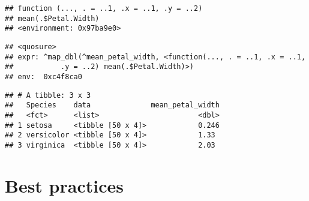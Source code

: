\documentclass[]{book}
\newenvironment{Shaded}{\begin{snugshade}}{\end{snugshade}}
\newcommand{\DataTypeTok}[1]{\textcolor[rgb]{0.13,0.29,0.53}{#1}}
\newcommand{\KeywordTok}[1]{\textcolor[rgb]{0.13,0.29,0.53}{\textbf{#1}}}
\newcommand{\NormalTok}[1]{#1}
\newcommand{\OperatorTok}[1]{\textcolor[rgb]{0.81,0.36,0.00}{\textbf{#1}}}
\newcommand{\StringTok}[1]{\textcolor[rgb]{0.31,0.60,0.02}{#1}}
\begin{document}
\begin{Shaded}
\end{Shaded}

\begin{verbatim}
## function (..., . = ..1, .x = ..1, .y = ..2) 
## mean(.$Petal.Width)
## <environment: 0x97ba9e0>
\end{verbatim}

\begin{Shaded}
\end{Shaded}

\begin{verbatim}
## <quosure>
## expr: ^map_dbl(^mean_petal_width, <function(..., . = ..1, .x = ..1,
##           .y = ..2) mean(.$Petal.Width)>)
## env:  0xc4f8ca0
\end{verbatim}

\begin{Shaded}
\end{Shaded}

\begin{verbatim}
## # A tibble: 3 x 3
##   Species    data              mean_petal_width
##   <fct>      <list>                       <dbl>
## 1 setosa     <tibble [50 x 4]>            0.246
## 2 versicolor <tibble [50 x 4]>            1.33 
## 3 virginica  <tibble [50 x 4]>            2.03
\end{verbatim}

\hypertarget{best-practices}{%
\chapter{Best practices}\label{best-practices}}
\end{document}
